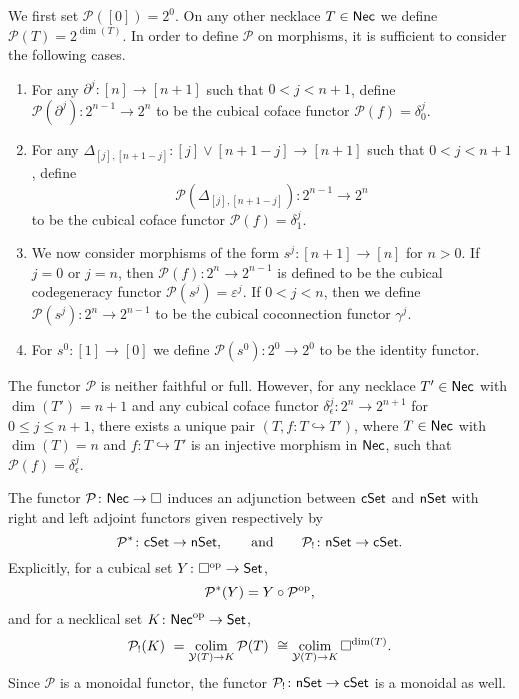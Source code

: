 We first set $\mathcal{P}([0])=2^0$.
On any other necklace $T \in \mathsf{Nec}$ we define $\mathcal{P}( T )= 2^{\dim(T)}$.
In order to define $\mathcal{P}$ on morphisms, it is sufficient to consider the following cases.
\begin{enumerate}
	\item For any $\partial^j \colon [n] \to [n+1]$ such that $0< j<{n+1}$, define $\mathcal{P}(\partial^j) \colon 2^{n-1}\to 2^{n}$ to be the cubical coface functor $\mathcal{P}(f)= \delta_0^{j}$.

	\item For any $\Delta_{[j], [n+1-j]} \colon [j] \vee [n+1-j] \to [n+1]$ such that $0<j<n+1$, define
	\[
	\mathcal{P}(\Delta_{[j], [n+1-j]}) \colon 2^{n-1}\to 2^{n}
	\]
	to be the cubical coface functor $\mathcal{P}(f)=\delta_1^{j}$.

	\item We now consider morphisms of the form $s^j \colon [n+1] \to [n]$ for $n>0$.
	If $j=0$ or $j=n$, then $\mathcal{P}(f) \colon 2^n \to 2^{n-1}$ is defined to be the cubical codegeneracy functor $\mathcal{P}(s^j)= \varepsilon^{j}$.
	If $0<j<n$, then we define $\mathcal{P}(s^j) \colon 2^n \to 2^{n-1}$ to be the cubical coconnection functor $\gamma^{j}$.

	\item For $s^0 \colon [1] \to [0]$ we define $\mathcal{P}(s^0) \colon 2^0 \to 2^0$ to be the identity functor.
\end{enumerate}

\begin{remark}
	The functor $\mathcal{P}$ is neither faithful or full.
	However, for any necklace $T' \in \mathsf{Nec}$ with $\dim(T')=n+1$ and any cubical coface functor $\delta_{\epsilon}^j \colon 2^n \to 2^{n+1}$ for $0 \leq j \leq n+1$, there exists a unique pair $(T, f \colon T \hookrightarrow T')$, where $T \in \mathsf{Nec}$ with $\dim(T)=n$ and $f \colon T \hookrightarrow T'$ is an injective morphism in $\mathsf{Nec}$, such that $\mathcal{P}(f) = \delta_{\epsilon}^j $.
\end{remark}

The functor $\mathcal{P} \colon \mathsf{Nec} \to \square$ induces an adjunction between $\mathsf{cSet}$ and $\mathsf{nSet}$ with right and left adjoint functors given respectively by
\[
\mathcal{P}^\ast \colon \mathsf{cSet} \to \mathsf{nSet},
\qquad \text{and} \qquad
\mathcal{P}_{!} \colon \mathsf{nSet} \to \mathsf{cSet}.
\]
Explicitly, for a cubical set $Y \colon \square^{\mathrm{op}} \to \mathsf{Set}$,
\[
\mathcal{P}^\ast(Y)= Y \circ \mathcal{P}^{\mathrm{op}},
\]
and for a necklical set $K \colon \mathsf{Nec}^{\mathrm{op}} \to \mathsf{Set}$,
\[
\mathcal{P}_{!}(K) \ =
\operatorname*{colim}_{\mathcal{Y}(T) \to K} \mathcal{P}(T) \ \cong
\operatorname*{colim}_{\mathcal{Y}(T) \to K} \square^{\dim(T)}.
\]
Since $\mathcal{P}$ is a monoidal functor, the functor $\mathcal{P}_{!} \colon \mathsf{nSet} \to \mathsf{cSet}$ is a monoidal as well.

